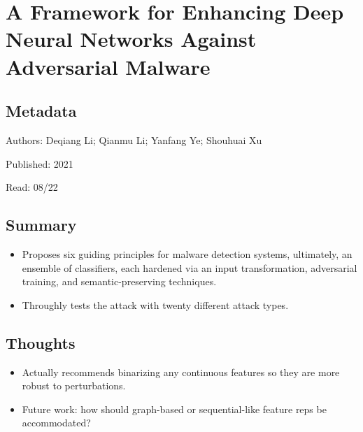 \documentclass{article}
\begin{document}

\section*{A Framework for Enhancing Deep Neural Networks Against Adversarial Malware}

\subsection*{Metadata}

\noindent Authors: Deqiang Li; Qianmu Li; Yanfang Ye; Shouhuai Xu

\noindent Published: 2021

\noindent Read: 08/22

\subsection*{Summary}
\begin{itemize}
\item Proposes six guiding principles for malware detection systems, ultimately, an ensemble of classifiers, each hardened via an input transformation, adversarial training, and semantic-preserving techniques.
\item Throughly tests the attack with twenty different attack types.
\end{itemize}

\subsection*{Thoughts}
\begin{itemize}
\item Actually recommends binarizing any continuous features so they are more robust to perturbations.
\item Future work: how should graph-based or sequential-like feature reps be accommodated?
\end{itemize}
\end{document}
